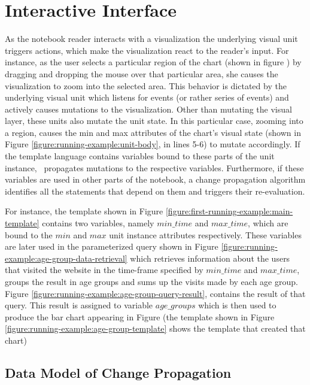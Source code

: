 \section{Interactive Interface}
\label{section:interactive-interface}



As the notebook reader interacts with a visualization the underlying visual unit triggers actions, which make the visualization react to the reader's input. For instance, as the user selects a particular region of the chart (shown in figure ) by dragging and dropping the mouse over that particular area, she causes the visualization to zoom into the selected area. This behavior is dictated by the underlying visual unit which listens for events (or rather series of events) and actively causes mutations to the visualization. Other than mutating the visual layer, these units also mutate the unit state. In this particular case, zooming into a region, causes the min and max attributes of the chart's visual state (shown in Figure \ref{figure:running-example:unit-body}, in lines 5-6) to mutate accordingly. If the template language contains variables bound to these parts of the unit instance, \projname\ propagates mutations to the respective variables. Furthermore, if these variables are used in other parts of the notebook, a change propagation algorithm identifies all the statements that depend on them and triggers their re-evaluation.


For instance, the template shown in Figure \ref{figure:first-running-example:main-template} contains two variables, namely $min\_time$ and $max\_time$, which are bound to the $min$ and $max$ unit instance attributes respectively. These variables are later used in the parameterized query shown in Figure \ref{figure:running-example:age-group-data-retrieval} which retrieves information about the users that visited the website in the time-frame specified by $min\_time$ and $max\_time$, groups the result in age groups and sums up the visits made by each age group. Figure \ref{figure:running-example:age-group-query-result}, contains the result of that query. This result is assigned to variable $age\_groups$ which is then used to produce the bar chart appearing in Figure  (the template shown in Figure \ref{figure:running-example:age-group-template} shows the template that created that chart)


\subsection{Data Model of Change Propagation}
\label{section:change-propagation-datamodel}

